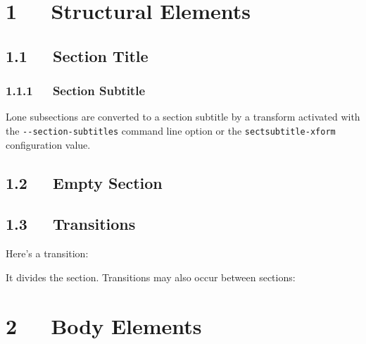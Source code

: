 \documentclass[a4paper]{memoir}
\providecommand*{\DUtransition}{%
  \hspace*{\fill}\hrulefill\hspace*{\fill}
  \vskip 0.5\baselineskip
}
\begin{document}


\pagebreak[4] %

\label{table-of-contents}
\renewcommand{\contentsname}{Table of Contents}
\tableofcontents


\chapter{1   Structural Elements%
  \label{structural-elements}%
}


\section{1.1   Section Title%
  \label{section-title}%
}


\subsection{1.1.1   Section Subtitle%
  \label{section-subtitle}%
}

Lone subsections are converted to a section subtitle by a transform
activated with the \texttt{-{}-section-subtitles} command line option or the
\texttt{sectsubtitle-xform} configuration value.


\section{1.2   Empty Section%
  \label{empty-section}%
}


\section{1.3   Transitions%
  \label{transitions}%
}

Here's a transition:

\DUtransition

It divides the section.  Transitions may also occur between sections:

\DUtransition


\chapter{2   Body Elements%
  \label{body-elements}%
}
\end{document}
